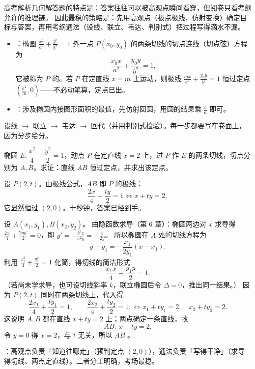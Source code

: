 \begin{explore}

高考解析几何解答题的特点是：答案往往可以被高观点瞬间看穿，但阅卷只看考纲允许的推理链。
因此最稳的策略是：先用高观点（极点极线、仿射变换）确定目标与答案，再用考纲通法（设线、联立、韦达、判别式）把过程写得滴水不漏。

\begin{itemize}
  \item {}：椭圆 $\frac{x^2}{a^2}+\frac{y^2}{b^2}=1$ 外一点 $P(x_0,y_0)$ 的两条切线的切点连线（切点弦）方程为
  \[
    \frac{x_0x}{a^2}+\frac{y_0y}{b^2}=1,
  \]
  它被称为 $P$ 的。若 $P$ 在定直线 $x=m$ 上运动，则极线 $\frac{mx}{a^2}+\frac{y_0y}{b^2}=1$ 恒过定点 $\left(\frac{a^2}{m},0\right)$——不必动笔算，定点已出。
  \item {}：涉及椭圆内接图形面积的最值，先仿射回圆，用圆的结果乘 $\frac{b}{a}$ 即可。
\end{itemize}

设线 $\to$ 联立 $\to$ 韦达 $\to$ 回代（并用判别式检验）。每一步都要写在卷面上，因为分步给分。

\begin{example}[两层对照示范]
椭圆 $E:\dfrac{x^2}{4}+\dfrac{y^2}{2}=1$，动点 $P$ 在定直线 $x=2$ 上，过 $P$ 作 $E$ 的两条切线，切点分别为 $A,B$。求证：直线 $AB$ 恒过定点，并求出该定点。
\end{example}
\begin{solution}
设 $P(2,t)$。由极线公式，$AB$ 即 $P$ 的极线：
\[
  \frac{2x}{4}+\frac{ty}{2}=1\iff x+ty=2,
\]
它显然恒过 $(2,0)$。十秒钟，答案已经到手。

设 $A(x_1,y_1),B(x_2,y_2)$。
由隐函数求导（第 6 章）：椭圆两边对 $x$ 求导得 $\frac{2x}{4}+\frac{2yy'}{2}=0$，即 $y'=-\frac{b^2x}{a^2y}=-\frac{x}{2y}$。
所以椭圆在 $A$ 处的切线方程为
\[
  y-y_1=-\frac{x_1}{2y_1}(x-x_1).
\]
利用 $\frac{x_1^2}{4}+\frac{y_1^2}{2}=1$ 化简，得切线的简洁形式
\[
  \frac{x_1x}{4}+\frac{y_1y}{2}=1.
\]
（若尚未学求导，也可设切线斜率 $k$，联立椭圆后令 $\Delta=0$，推出同一结果。）
因为 $P(2,t)$ 同时在两条切线上，代入得
\[
  \frac{2x_1}{4}+\frac{ty_1}{2}=1,\qquad \frac{2x_2}{4}+\frac{ty_2}{2}=1,
  \iff x_1+ty_1=2,\quad x_2+ty_2=2.
\]
这说明 $A,B$ 都在直线 $x+ty=2$ 上；两点确定一条直线，故
\[
  AB:\ x+ty=2.
\]
令 $y=0$ 得 $x=2$，与 $t$ 无关，所以 $AB$ 。

：高观点负责「知道往哪走」（预判定点 $(2,0)$），通法负责「写得干净」（求导得切线、两点定直线）。二者分工明确，考场最稳。
\end{solution}


\end{explore}
